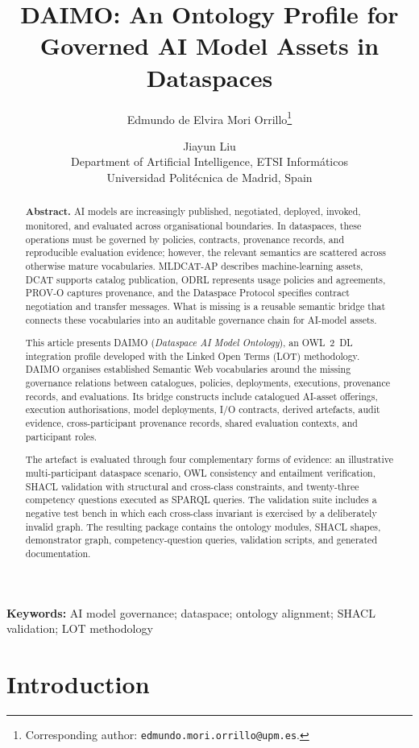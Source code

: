\documentclass[11pt,a4paper]{article}
\title{DAIMO: An Ontology Profile for Governed AI Model Assets in Dataspaces}
\author{Edmundo de Elvira Mori Orrillo\thanks{Corresponding author: \texttt{edmundo.mori.orrillo@upm.es}.} \and Jiayun Liu \\[0.5em]
\normalsize Department of Artificial Intelligence, ETSI Inform\'aticos\\
\normalsize Universidad Polit\'ecnica de Madrid, Spain}
\date{}
\providecommand{\keywords}[1]{\medskip\noindent\textbf{Keywords:} #1}
\begin{document}
\maketitle

\begin{abstract}
\noindent\textbf{Abstract.}
AI models are increasingly published, negotiated, deployed, invoked, monitored, and evaluated across organisational boundaries. In dataspaces, these operations must be governed by policies, contracts, provenance records, and reproducible evaluation evidence; however, the relevant semantics are scattered across otherwise mature vocabularies. MLDCAT-AP describes machine-learning assets, DCAT supports catalog publication, ODRL represents usage policies and agreements, PROV-O captures provenance, and the Dataspace Protocol specifies contract negotiation and transfer messages. What is missing is a reusable semantic bridge that connects these vocabularies into an auditable governance chain for AI-model assets.

This article presents DAIMO (\emph{Dataspace AI Model Ontology}), an OWL~2~DL integration profile developed with the Linked Open Terms (LOT) methodology. DAIMO organises established Semantic Web vocabularies around the missing governance relations between catalogues, policies, deployments, executions, provenance records, and evaluations. Its bridge constructs include catalogued AI-asset offerings, execution authorisations, model deployments, I/O contracts, derived artefacts, audit evidence, cross-participant provenance records, shared evaluation contexts, and participant roles.

The artefact is evaluated through four complementary forms of evidence: an illustrative multi-participant dataspace scenario, OWL consistency and entailment verification, SHACL validation with structural and cross-class constraints, and twenty-three competency questions executed as SPARQL queries. The validation suite includes a negative test bench in which each cross-class invariant is exercised by a deliberately invalid graph. The resulting package contains the ontology modules, SHACL shapes, demonstrator graph, competency-question queries, validation scripts, and generated documentation.
\end{abstract}

\keywords{AI model governance; dataspace; ontology alignment; SHACL validation; LOT methodology}

\section{Introduction}\label{sec:intro}
\end{document}
